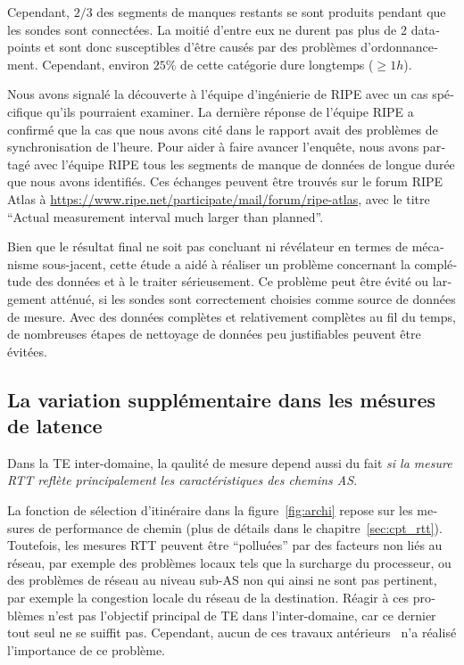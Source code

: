 \begin{otherlanguage}{french}
Cependant, $2/3$ des segments de manques restants se sont produits pendant que les sondes sont connectées.
La moitié d'entre eux ne durent pas plus de 2 datapoints et sont donc susceptibles d'être causés par des problèmes d'ordonnancement. 
Cependant, environ $25\%$ de cette catégorie dure longtemps ($\geq 1h$).

Nous avons signalé la découverte à l'équipe d'ingénierie de RIPE avec un cas spécifique qu'ils pourraient examiner.
La dernière réponse de l'équipe RIPE a confirmé que la cas que nous avons cité dans le rapport avait des problèmes de synchronisation de l'heure. 
Pour aider à faire avancer l'enquête, nous avons partagé avec l'équipe RIPE tous les segments de manque de données de longue durée que nous avons identifiés. 
Ces échanges peuvent être trouvés sur le forum RIPE Atlas à \url{https://www.ripe.net/participate/mail/forum/ripe-atlas}, avec le titre ``Actual measurement interval much larger than planned''.

Bien que le résultat final ne soit pas concluant ni révélateur en termes de mécanisme sous-jacent, cette étude a aidé à réaliser un problème concernant la complétude des données et à le traiter sérieusement.
Ce problème peut être évité ou largement atténué, si les sondes sont correctement choisies comme source de données de mesure.
Avec des données complètes et relativement complètes au fil du temps, de nombreuses étapes de nettoyage de données peu justifiables peuvent être évitées.

\subsection*{La variation supplémentaire dans les mésures de latence}

Dans la TE inter-domaine, la qaulité de mesure depend aussi du fait \textit{si la mesure RTT reflète principalement les caractéristiques des chemins AS}.

La fonction de sélection d'itinéraire dans la figure~\ref{fig:archi} repose sur les mesures de performance de chemin (plus de détails dans le chapitre~\ref{sec:cpt_rtt}).
Toutefois, les mesures RTT peuvent être ``polluées'' par des facteurs non liés au réseau, par exemple des problèmes locaux tels que la surcharge du processeur,
 ou des problèmes de réseau au niveau sub-AS non qui ainsi ne sont pas pertinent, par exemple la congestion locale du réseau de la destination.
Réagir à ces problèmes n'est pas l'objectif principal de TE dans l'inter-domaine, car ce dernier tout seul ne se suiffit pas.
Cependant, aucun de ces travaux antérieurs~\cite{Goldenberg2004, Akella2008} n'a réalisé l'importance de ce problème.


\end{otherlanguage}
